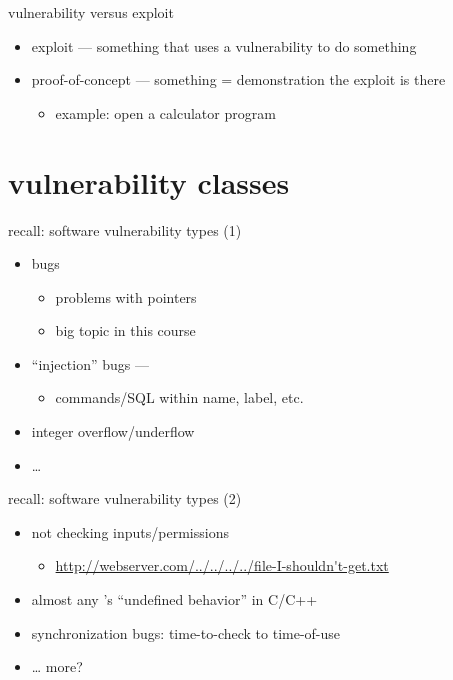 \begin{frame}{vulnerability versus exploit}
    \begin{itemize}
    \item exploit --- something that uses a vulnerability to do something
    \item proof-of-concept --- something = demonstration the exploit is there
        \begin{itemize}
        \item example: open a calculator program
        \end{itemize}
    \end{itemize}
\end{frame}

\section{vulnerability classes}

\begin{frame}{recall: software vulnerability types (1)}
    \begin{itemize}
    \item {} bugs
        \begin{itemize}
        \item problems with pointers
        \item big topic in this course
        \end{itemize}
    \item ``injection'' bugs --- 
        \begin{itemize}
        \item commands/SQL within name, label, etc.
        \end{itemize}
    \item integer overflow/underflow
    \item \ldots
    \end{itemize}
\end{frame}

\begin{frame}{recall: software vulnerability types (2)}
    \begin{itemize}
    \item not checking inputs/permissions
        \begin{itemize}
        \item \url{http://webserver.com/../../../../file-I-shouldn't-get.txt}
        \end{itemize}
    \item almost any 's ``undefined behavior'' in C/C++
    \item synchronization bugs: time-to-check to time-of-use
    \item \ldots{} more?
    \end{itemize}
\end{frame}

